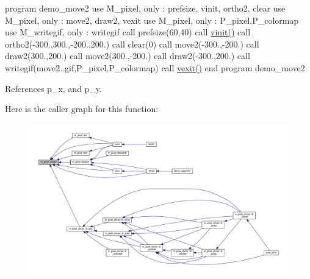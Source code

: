 program demo\+\_\+move2 use M\+\_\+pixel, only \+: prefsize, vinit, ortho2, clear use M\+\_\+pixel, only \+: move2, draw2, vexit use M\+\_\+pixel, only \+: P\+\_\+pixel,P\+\_\+colormap use M\+\_\+writegif, only \+: writegif call prefsize(60,40) call \hyperlink{namespacem__pixel_ac03ca8f23fdadb60599b6ea4dc87a6d9}{vinit()} call ortho2(-\/300.,300.,-\/200.,200.) call clear(0) call move2(-\/300.,-\/200.) call draw2(300.,200.) call move2(300.,-\/200.) call draw2(-\/300.,200.) call writegif(\textquotesingle{}move2..\+gif\textquotesingle{},P\+\_\+pixel,P\+\_\+colormap) call \hyperlink{namespacem__pixel_a19ad6b65752322b0029a62cc0ebec3e8}{vexit()} end program demo\+\_\+move2 

References p\+\_\+x, and p\+\_\+y.

Here is the caller graph for this function\+:
\nopagebreak
\begin{figure}[H]
\begin{center}
\leavevmode
\includegraphics[width=350pt]{namespacem__pixel_ab5d4dc474ff84dc0f3f35f4a395979e0_icgraph}
\end{center}
\end{figure}
\mbox{\label{namespacem__pixel_a80dece6adac704024a5a76efee697770}} 
